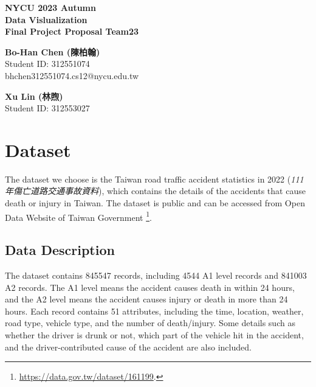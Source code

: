 \documentclass[a4paper, oneside, final, 12pt]{scrartcl} %
\begin{document}


\begin{center}
    {\fontsize{18}{30}\textbf{NYCU 2023 Autumn \\ Data Vislualization \\ Final Project Proposal Team23}} \\
\end{center}

  \begin{minipage}[t]{0.45\textwidth}
    \begin{center}
      \textbf{Bo-Han Chen (陳柏翰)} \\
      Student ID: 312551074 \\
      bhchen312551074.cs12@nycu.edu.tw
    \end{center}
  \end{minipage}
  \begin{minipage}[t]{0.45\textwidth}
    \begin{center}
      \textbf{Xu Lin (林煦)} \\
      Student ID: 312553027 \\
    \end{center}
  \end{minipage}

\section{Dataset}

\begingroup
\raggedright

The dataset we choose is the Taiwan road traffic accident statistics 
in 2022 (\emph{111年傷亡道路交通事故資料}), which contains the details of
the accidents that cause death or injury in Taiwan.
The dataset is public and can be accessed from Open Data Website of Taiwan Government
\footnote{\url{https://data.gov.tw/dataset/161199}.}.

\subsection{Data Description}

The dataset contains 845547 records, 
including 4544 A1 level records and 841003 A2 records.
The A1 level means the accident causes death in within 24 hours,
and the A2 level means the accident causes injury or death in more than 24 hours.
Each record contains 51 attributes, including the time, location,
weather, road type, vehicle type, and the number of death/injury.
Some details such as whether the driver is drunk or not, 
which part of the vehicle hit in the accident, 
and the driver-contributed cause of the accident are also included.
\end{document}
